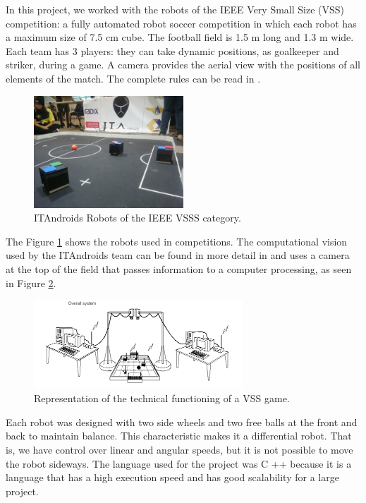 \documentclass[conference]{IEEEtran}
\begin{document}
In this project, we worked with the robots of the IEEE Very Small Size (VSS) competition: a fully automated robot soccer competition in which each robot has a maximum size of 7.5 cm cube. The football field is 1.5 m long and 1.3 m wide. Each team has 3 players: they can take dynamic positions, as goalkeeper and striker, during a game. A camera provides the aerial view with the positions of all elements of the match. The complete rules can be read in \cite{CBR2008}.

\begin{figure}[H]
	\centering
	\includegraphics[width=0.5\textwidth]{figures/vss-min.JPG}
   \caption{ITAndroids Robots of the IEEE VSSS category.} \label{fig:vss}
\end{figure}


The Figure \ref{fig:vss} shows the robots used in competitions. The computational vision used by the ITAndroids team can be found in more detail in \cite{zickler2009ssl} and uses a camera at the top of the field that passes information to a computer processing, as seen in Figure \ref{fig:funcioamento}.

\begin{figure}[H]
	\centering
		\includegraphics[width=0.7\textwidth]{figures/overview.png}
  \caption{Representation of the technical functioning of a VSS game.}
	\label{fig:funcioamento}
\end{figure}

Each robot was designed with two side wheels and two free balls at the front and back to maintain balance. This characteristic makes it a differential robot. That is, we have control over linear and angular speeds, but it is not possible to move the robot sideways. The language used for the project was C ++ because it is a language that has a high execution speed and has good scalability for a large project.
\end{document}
